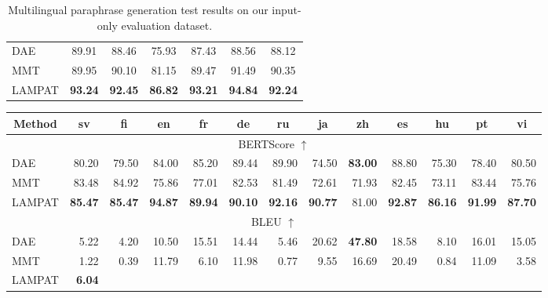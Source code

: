\documentclass[letterpaper]{article} %
\begin{document}
\begin{table}[h!]
{\begin{tabular}{|l|cccccc|}
DAE               & 89.91          & 88.46          & 75.93          & 87.43          & 88.56          & 88.12          \\
MMT & 89.95          & 90.10          & 81.15          & 89.47          & 91.49          & 90.35          \\
LAMPAT                 & \textbf{93.24} & \textbf{92.45} & \textbf{86.82} & \textbf{93.21} & \textbf{94.84} & \textbf{92.24} \\ \hline
\end{tabular}}
\caption{Multilingual paraphrase generation test results on our input-only evaluation dataset.}
\label{tab:perf_inp_only}
\end{table}

\begin{table}[h!]
    \centering
    {\begin{tabular}{|lrrrrrrrrrrrr|}
\hline
\multicolumn{1}{|c|}{Method} &
  \multicolumn{1}{c}{sv} &
  \multicolumn{1}{c}{fi} &
  \multicolumn{1}{c}{en} &
  \multicolumn{1}{c}{fr} &
  \multicolumn{1}{c}{de} &
  \multicolumn{1}{c}{ru} &
  \multicolumn{1}{c}{ja} &
  \multicolumn{1}{c}{zh} &
  \multicolumn{1}{c}{es} &
  \multicolumn{1}{c}{hu} &
  \multicolumn{1}{c}{pt} &
  \multicolumn{1}{c|}{vi} \\ \hline
\multicolumn{13}{|c|}{BERTScore $\uparrow$} \\ \hline
\multicolumn{1}{|l|}{DAE} &
  80.20 &
  79.50 &
  84.00 &
  85.20 &
  89.44 &
  89.90 &
  74.50 &
  \textbf{83.00} &
  88.80 &
  75.30 &
  78.40 &
  80.50 \\
\multicolumn{1}{|l|}{MMT} &
  83.48 &
  84.92 &
  75.86 &
  77.01 &
  82.53 &
  81.49 &
  72.61 &
  71.93 &
  82.45 &
  73.11 &
  83.44 &
  75.76 \\
\multicolumn{1}{|l|}{LAMPAT} &
  \textbf{85.47} &
  \textbf{85.47} &
  \textbf{94.87} &
  \textbf{89.94} &
  \textbf{90.10}&
  \textbf{92.16} &
  \textbf{90.77} &
  81.00 &
  \textbf{92.87} &
  \textbf{86.16} &
  \textbf{91.99} &
  \textbf{87.70} \\ \hline
\multicolumn{13}{|c|}{BLEU $\uparrow$} \\ \hline
\multicolumn{1}{|l|}{DAE} &
  5.22 &
  4.20 &
  10.50 &
  15.51 &
  14.44 &
  5.46 &
  20.62 &
  \textbf{47.80} &
  18.58 &
  8.10 &
  16.01 &
  15.05 \\
\multicolumn{1}{|l|}{MMT} &
  1.22 &
  0.39 &
  11.79 &
  6.10 &
  11.98 &
  0.77 &
  9.55 &
  16.69 &
  20.49 &
  0.84 &
  11.09 &
  3.58 \\
\multicolumn{1}{|l|}{LAMPAT} &
  \textbf{6.04} &

\end{tabular}}
\end{table}
\end{document}
